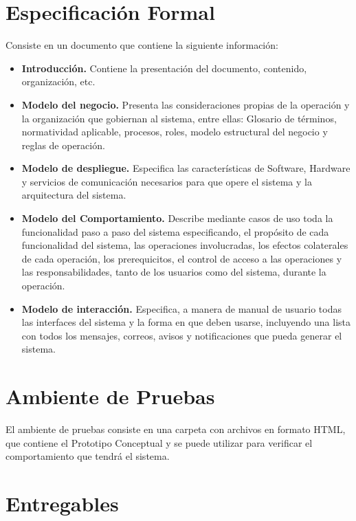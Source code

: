 \documentclass[10pt]{book}
\begin{document}
\section{Especificación Formal}

	Consiste en un documento que contiene la siguiente información:
	
\begin{itemize}
	\item {\bf Introducción.} Contiene la presentación del documento, contenido, organización, etc.
	\item {\bf Modelo del negocio.} Presenta las consideraciones propias de la operación y la organización que gobiernan al sistema, entre ellas: Glosario de términos, normatividad aplicable, procesos, roles, modelo estructural del negocio y reglas de operación.
	\item {\bf Modelo de despliegue.} Especifica las características de Software, Hardware y servicios de comunicación necesarios para que opere el sistema y la arquitectura del sistema.
	\item {\bf Modelo del Comportamiento.} Describe mediante casos de uso toda la funcionalidad paso a paso del sistema especificando, el propósito de cada funcionalidad del sistema, las operaciones involucradas, los efectos colaterales de cada operación, los prerequicitos, el control de acceso a las operaciones y las responsabilidades, tanto de los usuarios como del sistema, durante la operación.
	\item {\bf Modelo de interacción.} Especifica, a manera de manual de usuario todas las interfaces del sistema y la forma en que deben usarse, incluyendo una lista con todos los mensajes, correos, avisos y notificaciones que pueda generar el sistema.
\end{itemize}


\section{Ambiente de Pruebas}

	El ambiente de pruebas consiste en una carpeta con archivos en formato HTML, que contiene el Prototipo Conceptual y se puede utilizar para verificar el comportamiento que tendrá el sistema.

\section{Entregables}
	
\end{document}
